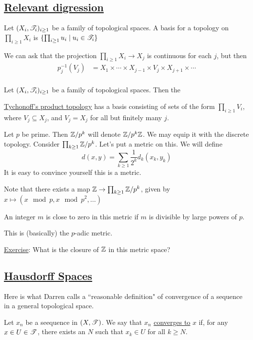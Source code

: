 \documentclass[x11names,reqno,14pt]{extarticle}
\begin{document}
\subsection*{\underline{Relevant digression}}

Let $(X_i, \mathscr{T}_i)_{i\geq1}$ be a family of topological spaces. A basis for a topology on $\prod_{i\geq1}X_i$ is $\{\prod_{i\geq1}u_i \mid u_i \in \mathscr{T}_i\}$

We can ask that the projection $\prod_{i\geq1}X_i\to X_j$ is continuous for each $j$, but then 
\begin{align*}
p_j^{-1}(V_j) & = X_1\times\cdots\times X_{j - 1}\times V_j \times X_{j + 1} \times \cdots \\
\end{align*}


Let $(X_i, \mathscr{T}_i)_{i\geq1}$ be a family of topological spaces. Then the 

\underline{Tychonoff's product topology} has a basis consisting of sets of the form $\prod_{i\geq1}V_i$, where $V_j \subseteq X_j$, and $V_j = X_j$ for all but finitely many $j$. 

\exm

Let $p$ be prime. Then $\mathbb{Z}/p^k$ will denote $\mathbb{Z}/p^k\mathbb{Z}$. We may equip it with the discrete topology. Consider $\prod_{k\geq1}\mathbb{Z}/p^k$. Let's put a metric on this. We will define
\[
d(x, y) = \sum_{k\geq1}\frac{1}{2^k}d_k(x_k, y_k)
\]
It is easy to convince yourself this is a metric. 

Note that there exists a map $\mathbb{Z}\to\prod_{k\geq1}\mathbb{Z}/p^k$, given by $x \mapsto (x\mod p, x\mod {p^2}, \dots)$

An integer $m$ is close to zero in this metric if $m$ is divisible by large powers of $p$. 

This is (basically) the $p$-adic metric. 

\underline{Exercise}: What is the closure of $\mathbb{Z}$ in this metric space? 

\subsection*{\underline{Hausdorff Spaces}}


Here is what Darren calls a ``reasonable definition" of convergence of a sequence in a general topological space. 

Let $x_n$ be a seequence in $(X,\mathscr{T})$. We say that $x_n$  \underline{converges to} $x$ if, for any $x \in U \in \mathscr{T}$, there exists an $N$ such that $x_k \in U$ for all $k \geq N$. 
\end{document}
